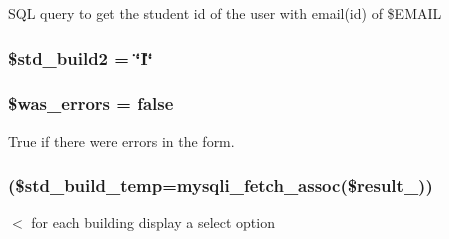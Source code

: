 \-S\-Q\-L query to get the student id of the user with email(id) of \$\-E\-M\-A\-I\-L \hypertarget{studentForm_8php_a2a52d5de3c70db963bd63f3cc0bdb09e}{
\subsubsection[{\$std\-\_\-build2}]{\setlength{\rightskip}{0pt plus 5cm}\$std\-\_\-build2 = \char`\"{}\-I\char`\"{}}}\label{studentForm_8php_a2a52d5de3c70db963bd63f3cc0bdb09e}
\hypertarget{studentForm_8php_ae8f928f475945454d3cfd1d4214c09f2}{
\subsubsection[{\$was\-\_\-errors}]{\setlength{\rightskip}{0pt plus 5cm}\$was\-\_\-errors = false}}\label{studentForm_8php_ae8f928f475945454d3cfd1d4214c09f2}
\-True if there were errors in the form. \hypertarget{studentForm_8php_abeb5d2366a9870820ffb1e260d040d8d}{
\subsubsection[{while}]{(\$std\-\_\-build\-\_\-temp=mysqli\-\_\-fetch\-\_\-assoc(\$result\-\_))}}\label{studentForm_8php_abeb5d2366a9870820ffb1e260d040d8d}
$<$ for each building display a select option 